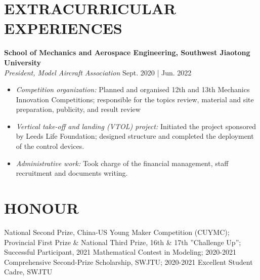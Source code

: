 \documentclass[a4paper,9pt]{extarticle}
\begin{document}
\section*{EXTRACURRICULAR EXPERIENCES}
\noindent
\textbf{School of Mechanics and Aerospace Engineering, Southwest Jiaotong University} \\ %
\textit{President, Model Aircraft Association} \hfill Sept. 2020 | Jun. 2022 %
\begin{itemize}
    \item \textit{Competition organization:} Planned and organised 12th and 13th Mechanics Innovation Competitions; responsible for the topics review, material and site preparation, publicity, and result review
    \item \textit{Vertical take-off and landing (VTOL) project:} Initiated the project sponsored by Leeds Life Foundation; designed structure and completed the deployment of the control devices.
    \item \textit{Administrative work:} Took charge of the financial management, staff recruitment and documents writing.
\end{itemize}

\section*{HONOUR}
\noindent
National Second Prize, China-US Young Maker Competition (CUYMC); Provincial First Prize \& National Third Prize, 16th \& 17th ”Challenge Up”; Successful Participant, 2021 Mathematical Contest in Modeling; 2020-2021 Comprehensive Second-Prize Scholarship, SWJTU; 2020-2021 Excellent Student Cadre, SWJTU


\end{document}
